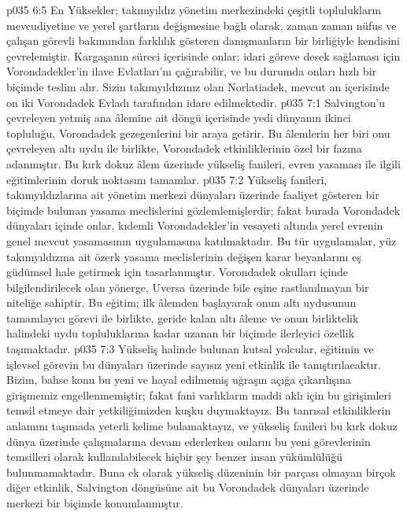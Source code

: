 \vs p035 6:5 En Yüksekler; takımyıldız yönetim merkezindeki çeşitli toplulukların mevcudiyetine ve yerel şartların değişmesine bağlı olarak, zaman zaman nüfus ve çalışan görevli bakımından farklılık gösteren danışmanların bir birliğiyle kendisini çevrelemiştir. Kargaşanın süreci içerisinde onlar; idari göreve desek sağlaması için Vorondadekler’in ilave Evlatları’nı çağırabilir, ve bu durumda onları hızlı bir biçimde teslim alır. Sizin takımyıldızınız olan Norlatiadek, mevcut an içerisinde on iki Vorondadek Evladı tarafından idare edilmektedir.
\vs p035 7:1 Salvington’u çevreleyen yetmiş ana âlemine ait döngü içerisinde yedi dünyanın ikinci topluluğu, Vorondadek gezegenlerini bir araya getirir. Bu âlemlerin her biri onu çevreleyen altı uydu ile birlikte, Vorondadek etkinliklerinin özel bir fazına adanmıştır. Bu kırk dokuz âlem üzerinde yükseliş fanileri, evren yasaması ile ilgili eğitimlerinin doruk noktasını tamamlar.
\vs p035 7:2 Yükseliş fanileri, takımyıldızlarına ait yönetim merkezi dünyaları üzerinde faaliyet gösteren bir biçimde bulunan yasama meclislerini gözlemlemişlerdir; fakat burada Vorondadek dünyaları içinde onlar, kıdemli Vorondadekler’in vesayeti altında yerel evrenin genel mevcut yasamasının uygulamasına katılmaktadır. Bu tür uygulamalar, yüz takımyıldızına ait özerk yasama meclislerinin değişen karar beyanlarını eş güdümsel hale getirmek için tasarlanmıştır. Vorondadek okulları içinde bilgilendirilecek olan yönerge, Uversa üzerinde bile eşine rastlanılmayan bir niteliğe sahiptir. Bu eğitim; ilk âlemden başlayarak onun altı uydusunun tamamlayıcı görevi ile birlikte, geride kalan altı âleme ve onun birliktelik halindeki uydu topluluklarına kadar uzanan bir biçimde ilerleyici özellik taşımaktadır.
\vs p035 7:3 Yükseliş halinde bulunan kutsal yolcular, eğitimin ve işlevsel görevin bu dünyaları üzerinde sayısız yeni etkinlik ile tanıştırılacaktır. Bizim, bahse konu bu yeni ve hayal edilmemiş uğraşın açığa çıkarılışına girişmemiz engellenmemiştir; fakat fani varlıkların maddi aklı için bu girişimleri temsil etmeye dair yetkiliğimizden kuşku duymaktayız. Bu tanrısal etkinliklerin anlamını taşımada yeterli kelime bulamaktayız, ve yükseliş fanileri bu kırk dokuz dünya üzerinde çalışmalarına devam ederlerken onların bu yeni görevlerinin temsilleri olarak kullanılabilecek hiçbir şey benzer insan yükümlülüğü bulunmamaktadır. Buna ek olarak yükseliş düzeninin bir parçası olmayan birçok diğer etkinlik, Salvington döngüsüne ait bu Vorondadek dünyaları üzerinde merkezi bir biçimde konumlanmıştır.
